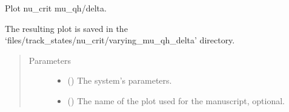 \documentclass[letterpaper,10pt,english]{sphinxmanual}
\begin{document}
\begin{fulllineitems}
\label{\detokenize{modules:modules.utils.plot_micro_nu_crit_vs_mu_qh_delta}}
\pysigstartsignatures
{}
\pysigstopsignatures
\sphinxAtStartPar
Plot nu\_crit  mu\_qh/delta.

\sphinxAtStartPar
The resulting plot is saved in the ‘files/track\_states/nu\_crit/varying\_mu\_qh\_delta’ directory.
\begin{quote}\begin{description}
\item[{Parameters}] \leavevmode\begin{itemize}
\item {} 
\sphinxAtStartPar
{} () \textendash{} The system’s parameters.

\item {} 
\sphinxAtStartPar
{} () \textendash{} The name of the plot used for the manuscript, optional.

\end{itemize}

\end{description}\end{quote}

\end{fulllineitems}

\end{document}
